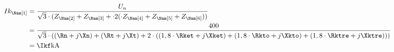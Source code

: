 {\FPeval\all{\yepET + \yepTO + \yepTRE}
\FPifzero{\all}
\begin{align*}
Ik_{\Nam[1]} &= \frac{U_n}{\sqrt{3} \cdot(Z_{\Nam[2]} + Z_{\Nam[3]} + \cdot 2 (\cdot Z_{\Nam[4]} + Z_{\Nam[5]} + Z_{\Nam[6]}) ) } \\
	&= \frac{400}{\sqrt{3} \cdot ((\Rn + j\Xn) + (\Rt + j\Xt) + 2 \cdot ((1,8 \cdot\Rket + j\Xket) + (1,8 \cdot\Rkto + j\Xkto) + (1,8 \cdot\Rktre + j\Xktre)))}\\
	&= \Ikf \unit{kA}
\end{align*}
\else
\fi
}


